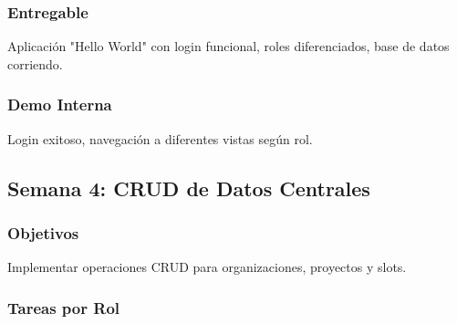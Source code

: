 \documentclass[12pt,a4paper]{article}
\begin{document}
\subsubsection{Entregable}
Aplicación "Hello World" con login funcional, roles diferenciados, base de datos corriendo.

\subsubsection{Demo Interna}
Login exitoso, navegación a diferentes vistas según rol.

\subsection{Semana 4: CRUD de Datos Centrales}

\subsubsection{Objetivos}
Implementar operaciones CRUD para organizaciones, proyectos y slots.

\subsubsection{Tareas por Rol}
\end{document}
